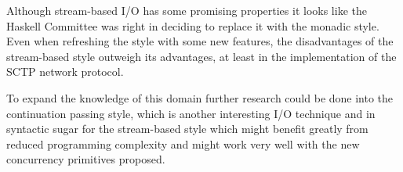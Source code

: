 Although stream-based I/O has some promising properties it looks like the Haskell Committee was right in deciding to replace it with the monadic style. Even when refreshing the style with some new features, the disadvantages of the stream-based style outweigh its advantages, at least in the implementation of the SCTP network protocol.

To expand the knowledge of this domain further research could be done into the continuation passing style, which is another interesting I/O technique and in syntactic sugar for the stream-based style which might benefit greatly from reduced programming complexity and might work very well with the new concurrency primitives proposed.
